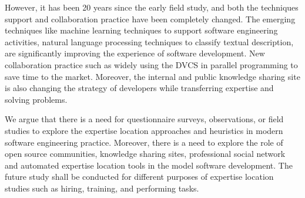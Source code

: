 However, it has been 20 years since the early field study, and both the techniques support and collaboration practice have been completely changed. The emerging techniques like machine learning techniques to support software engineering activities, natural language processing techniques to classify textual description, are significantly improving the experience of software development. New collaboration practice such as widely using the DVCS in parallel programming to save time to the market. Moreover, the internal and public knowledge sharing site is also changing the strategy of developers while transferring expertise and solving problems.

We argue that there is a need for questionnaire surveys, observations, or field studies to explore the expertise location approaches and heuristics in modern software engineering practice. Moreover, there is a need to explore the role of open source communities, knowledge sharing sites, professional social network and automated expertise location tools in the model software development. The future study shall be conducted for different purposes of expertise location studies such as hiring, training, and performing tasks.